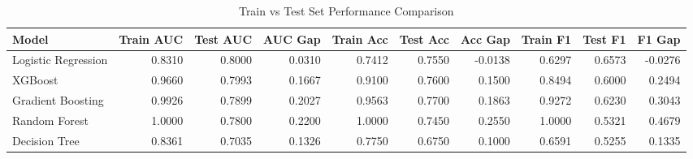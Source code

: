 \begin{table}
\caption{Train vs Test Set Performance Comparison}
\label{tab:train_vs_test}
\begin{tabular}{lrrrrrrrrr}
\toprule
Model & Train AUC & Test AUC & AUC Gap & Train Acc & Test Acc & Acc Gap & Train F1 & Test F1 & F1 Gap \\
\midrule
Logistic Regression & 0.8310 & 0.8000 & 0.0310 & 0.7412 & 0.7550 & -0.0138 & 0.6297 & 0.6573 & -0.0276 \\
XGBoost & 0.9660 & 0.7993 & 0.1667 & 0.9100 & 0.7600 & 0.1500 & 0.8494 & 0.6000 & 0.2494 \\
Gradient Boosting & 0.9926 & 0.7899 & 0.2027 & 0.9563 & 0.7700 & 0.1863 & 0.9272 & 0.6230 & 0.3043 \\
Random Forest & 1.0000 & 0.7800 & 0.2200 & 1.0000 & 0.7450 & 0.2550 & 1.0000 & 0.5321 & 0.4679 \\
Decision Tree & 0.8361 & 0.7035 & 0.1326 & 0.7750 & 0.6750 & 0.1000 & 0.6591 & 0.5255 & 0.1335 \\
\bottomrule
\end{tabular}
\end{table}
